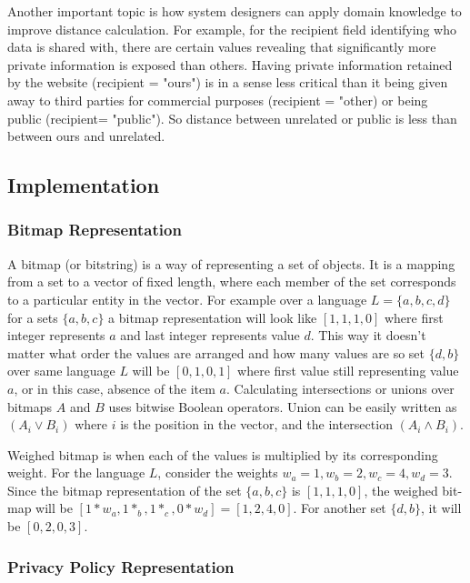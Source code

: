 Another important topic is how system designers can apply domain knowledge to improve distance calculation. For example, for the recipient field identifying who data is shared with, there are certain values revealing that significantly more private information is exposed than others. Having private information retained by the website (recipient = "ours") is in a sense less critical than it being given away to third parties for commercial purposes (recipient = "other) or being public (recipient= "public"). So distance between unrelated or public is less than between ours and unrelated.

\subsection{Implementation}

\subsubsection{Bitmap Representation}
A bitmap (or bitstring) is a way of representing a set of objects. It is a mapping from a set to a vector of fixed length, where each member of the set corresponds to a particular entity in the vector. For example over a language $L=\{a,b,c,d\}$ for a sets $\{a,b,c\}$ a bitmap representation will look like $[1, 1, 1, 0]$ where first integer represents $a$ and last integer represents value $d$. This way it doesn't matter what order the values are arranged and how many values are so set $\{d,b\}$ over same language $L$ will be $[0, 1, 0, 1]$ where first value still representing value $a$, or in this case, absence of the item $a$. Calculating intersections or unions over bitmaps $A$ and $B$ uses bitwise Boolean operators. Union can be easily written as $(A_i \vee B_i)$ where $i$ is the position in the vector, and the intersection $(A_i \wedge B_i)$.

Weighed bitmap is when each of the values is multiplied by its corresponding weight. For the language $L$, consider the weights $w_a=1, w_b=2, w_c=4, w_d=3$. Since the bitmap representation of the set $\{a,b,c\}$ is $[1, 1, 1, 0]$, the weighed bit-map will be $[1*w_a, 1*_b, 1*_c, 0*w_d]=[1, 2, 4, 0]$. For another set $\{d,b\}$, it will be $[0, 2, 0, 3]$.

\subsubsection{Privacy Policy Representation}

